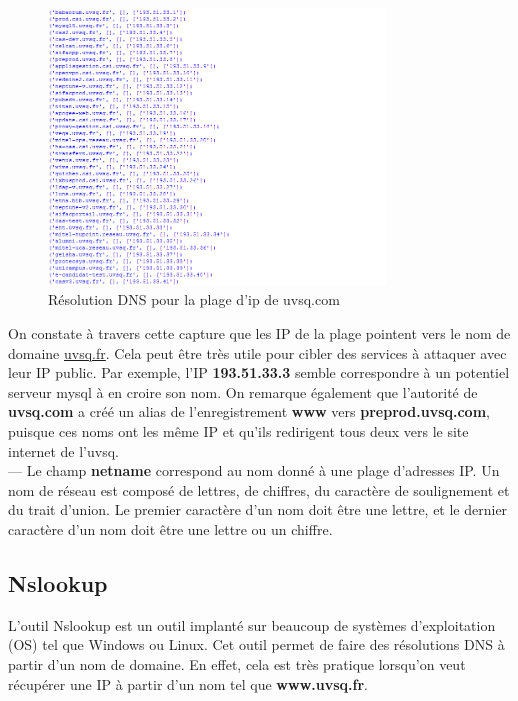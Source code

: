 \begin{figure}[b!]
  \centering
  \setlength\figureheight{7cm}
  \setlength\figurewidth{9cm}
  \includegraphics[width=0.8\textwidth]{oui/images/Whois/script-python.PNG}
  \caption{Résolution DNS pour la plage d'ip de uvsq.com}
  \label{fig:resultatprogpy}
\end{figure}

 On constate à travers cette capture que les IP de la plage pointent vers le nom de domaine \url{uvsq.fr}. Cela peut être très utile pour cibler des services à attaquer avec leur IP public. Par exemple, l'IP \textbf{193.51.33.3} semble correspondre à un potentiel serveur mysql à en croire son nom. On remarque également que l'autorité de \textbf{uvsq.com} a créé un alias de l'enregistrement \textbf{www} vers \textbf{preprod.uvsq.com}, puisque ces noms ont les même IP et qu'ils redirigent tous deux vers le site internet de l'uvsq.\\

 --- Le champ \textbf{netname} correspond au nom donné à une plage d'adresses IP. Un nom de réseau est composé de lettres, de chiffres, du caractère de soulignement et du trait d'union. Le premier caractère d'un nom doit être une lettre, et le dernier caractère d'un nom doit être une lettre ou un chiffre.\\

\subsection{Nslookup}

L'outil Nslookup est un outil implanté sur beaucoup de systèmes d'exploitation (OS) tel que Windows ou Linux. Cet outil permet de faire des résolutions DNS à partir d'un nom de domaine. En effet, cela est très pratique lorsqu'on veut récupérer une IP à partir d'un nom tel que \textbf{www.uvsq.fr}.\\

